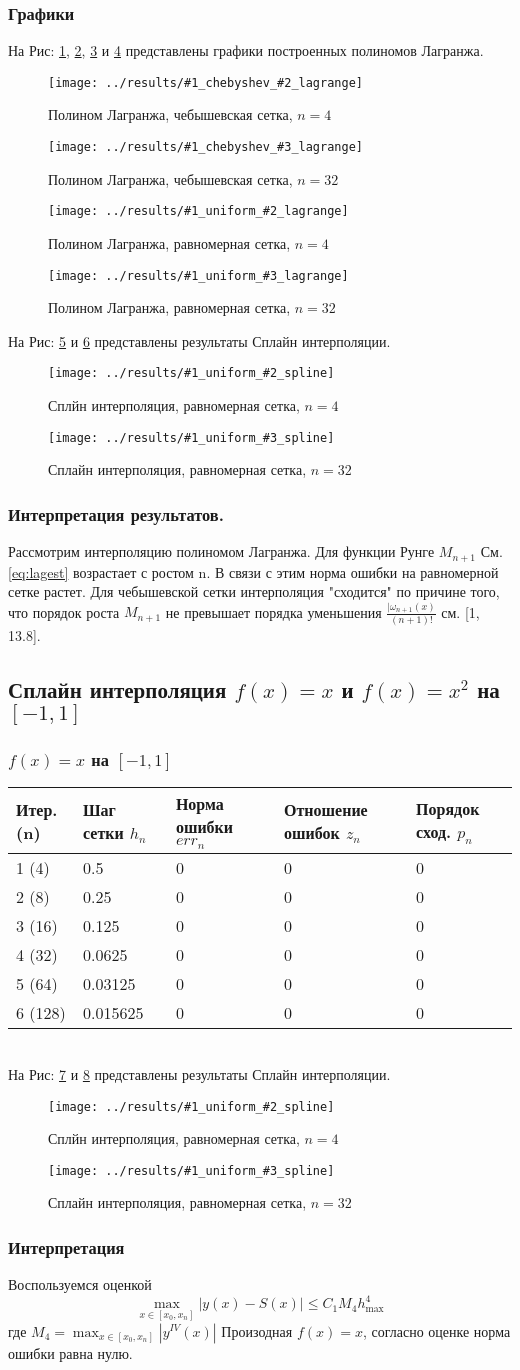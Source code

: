 \documentclass[12pt]{article}
\newcommand{\lagrange}[3] {
	На Рис: \ref{fig:#1chebyshev#2lagrange},  \ref{fig:#1chebyshev#3lagrange}, \ref{fig:#1uniform#2lagrange} и \ref{fig:#1uniform#3lagrange}
	представлены графики построенных полиномов Лагранжа.
	
	\begin{figure}[H]
		\centering
		\texttt{[image: ../results/\#1\_chebyshev\_\#2\_lagrange]}
		\caption{Полином Лагранжа, чебышевская сетка, $n = #2$}
		\label{fig:#1chebyshev#2lagrange}
	\end{figure}
	\begin{figure}[H]
		\centering
		\texttt{[image: ../results/\#1\_chebyshev\_\#3\_lagrange]}
		\caption{Полином Лагранжа, чебышевская сетка, $n = #3$}
		\label{fig:#1chebyshev#3lagrange}
	\end{figure}
	\begin{figure}[H]
		\centering
		\texttt{[image: ../results/\#1\_uniform\_\#2\_lagrange]}
		\caption{Полином Лагранжа, равномерная сетка, $n = #2$}
		\label{fig:#1uniform#2lagrange}
	\end{figure}
	\begin{figure}[H]
		\centering
		\texttt{[image: ../results/\#1\_uniform\_\#3\_lagrange]}
		\caption{Полином Лагранжа, равномерная сетка, $n = #3$}
		\label{fig:#1uniform#3lagrange}
	\end{figure}
}
\newcommand{\spline}[3] {
	На Рис:  \ref{fig:#1uniform#2spline} и \ref{fig:#1uniform#3spline} представлены результаты Сплайн интерполяции.
	
	\begin{figure}[H]
		\centering
		\texttt{[image: ../results/\#1\_uniform\_\#2\_spline]}
		\caption{Сплйн интерполяция, равномерная сетка, $n = #2$}
		\label{fig:#1uniform#2spline}
	\end{figure}
	\begin{figure}[H]
		\centering
		\texttt{[image: ../results/\#1\_uniform\_\#3\_spline]}
		\caption{Сплайн интерполяция, равномерная сетка, $n = #3$}
		\label{fig:#1uniform#3spline}
	\end{figure}
}
\begin{document}
\subsubsection{Графики}
\lagrange{runge}{4}{32}
\spline{runge}{4}{32}

\subsubsection{Интерпретация результатов.} 
Рассмотрим интерполяцию полиномом Лагранжа. Для функции Рунге $M_{n+1}$ См. \ref{eq:lagest} возрастает с ростом n. В связи с этим норма ошибки на равномерной сетке растет.
Для чебышевской сетки интерполяция "сходится" по причине того, что порядок роста $M_{n+1}$ не превышает порядка уменьшения $\frac{|\omega_{n+1}(x)}{(n + 1)!}$ см. [1, 13.8].

\subsection{Сплайн интерполяция $f(x) = x$ и $f(x) = x^2$ на $[-1, 1]$}

\subsubsection{$f(x) = x$ на $[-1, 1]$}
\begin{tabular}{|l|l|l|l|l|}
	\hline 
	Итер.(n) & Шаг сетки $h_n$ & Норма ошибки $err_n$ &  Отношение ошибок $z_n$ & Порядок сход. $p_n$ \\ \hline
	1 (4)  & 0.5 & 0 & 0 & 0 \\ \hline
	2 (8)  & 0.25 & 0 & 0 & 0 \\ \hline
	3 (16)  & 0.125 & 0 & 0 & 0 \\ \hline
	4 (32)  & 0.0625 & 0 & 0 & 0 \\ \hline
	5 (64)  & 0.03125 & 0 & 0 & 0 \\ \hline
	6 (128)  & 0.015625 & 0 & 0 & 0 \\ \hline
\end{tabular}\\

\spline{linear}{4}{32}

\subsubsection{Интерпретация}
Воспользуемся оценкой
\begin{equation}
\max _{x \in\left[x_{0}, x_{n}\right]}|y(x)-S(x)| \leqslant C_{1} M_{4} h_{\max }^{4}
\label{eq:spline}
\end{equation}
где $M_{4}=\max _{x \in\left[x_{0}, x_{n}\right]}\left|y^{I V}(x)\right|$
Произодная $f(x) = x$, согласно оценке норма ошибки равна нулю. 
\end{document}
